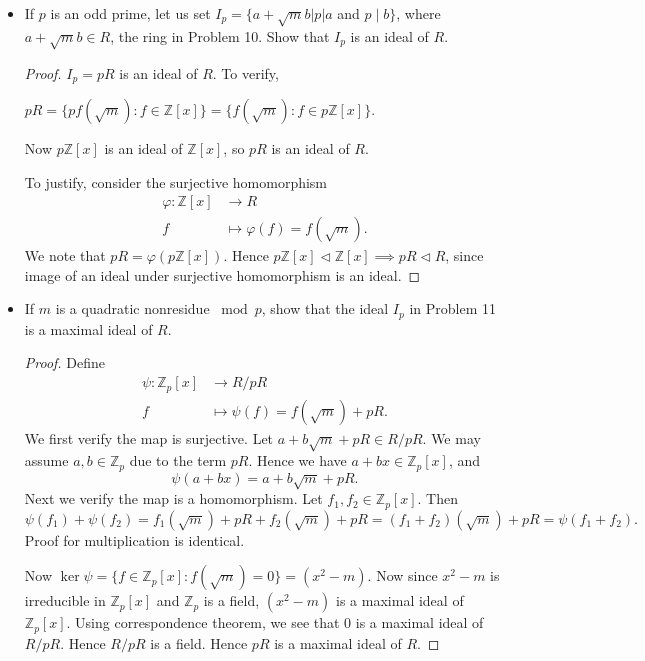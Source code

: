 \begin{itemize}
\begin{proof}
	Hence $R = \varphi(\mathbb{Z}[x])$ is a subring of $\mathbb{R}$. Hence $R$ is a ring.
\end{proof}

	\item [11.] If $p$ is an odd prime, let us set $I_p=\{a+\sqrt{m} b|p| a$ and $p \mid b\}$, where $a+\sqrt{m} b \in R$, the ring in Problem 10. Show that $I_p$ is an ideal of $R$.
\begin{proof}
	$I_p = pR$ is an ideal of $R$. To verify,

	$pR = \{pf(\sqrt{m}): f \in \mathbb{Z}[x]\} = \{f(\sqrt{m} ): f \in p \mathbb{Z}[x]\}  $.

	Now $p\mathbb{Z}[x]$ is an ideal of $\mathbb{Z}[x]$, so $pR$ is an ideal of $R$.
	
	To justify, consider the surjective homomorphism
	\begin{align*}
		\varphi: \mathbb{Z}[x] &\longrightarrow R \\
		f &\longmapsto \varphi(f) = f(\sqrt{m} )
	.\end{align*}
	We note that $pR = \varphi(p\mathbb{Z}[x])$. Hence $p\mathbb{Z}[x]\triangleleft \mathbb{Z}[x] \implies pR \triangleleft R$, since image of an ideal under surjective homomorphism is an ideal.
\end{proof}

	\item [12.] If $m$ is a quadratic nonresidue $\bmod p$, show that the ideal $I_p$ in Problem 11 is a maximal ideal of $R$.
\begin{proof}
	Define
	\begin{align*}
		\psi: \mathbb{Z}_p[x] &\longrightarrow R / pR \\
		f &\longmapsto \psi(f) = f(\sqrt{m} )+pR
	.\end{align*}
	We first verify the map is surjective. Let $a + b \sqrt{m}  + pR \in R / pR$. We may assume $a, b \in \mathbb{Z}_p$ due to the term $pR$. Hence we have $a + b x \in \mathbb{Z}_p [x]$, and
	\[
		\psi(a + b x) = a + b \sqrt{m} + pR
	.\] 
	Next we verify the map is a homomorphism. Let $f_1, f_2 \in \mathbb{Z}_p[x]$. Then
	\[
		\psi(f_1) + \psi(f_2) 
		= f_1(\sqrt{m}) + pR + f_2(\sqrt{m} )+ pR
		= (f_1+f_2)(\sqrt{m} ) + pR
		=\psi(f_1+f_2)
	.\] 
	Proof for multiplication is identical.

	Now $\operatorname{ker} \psi = \{f \in \mathbb{Z}_p[x]: f(\sqrt{m} ) = 0\}  = \left( x^2 - m \right) $. Now since $x^2 - m$ is irreducible in $\mathbb{Z}_p[x]$ and $\mathbb{Z}_p$ is a field, $\left( x^2 - m \right) $ is a maximal ideal of $\mathbb{Z}_p[x]$. Using correspondence theorem, we see that $0$ is a maximal ideal of $R / pR$. Hence $R / pR$ is a field. Hence $pR$ is a maximal ideal of $R$.
\end{proof}


\end{itemize}
